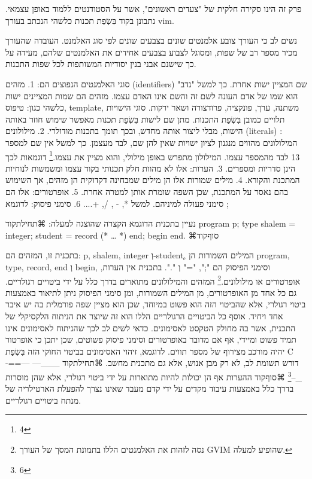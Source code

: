       פרק זה הינו סקירה חלקית של "צעדים ראשונים", אשר על הסטודנטים ללמוד באופן עצמאי.
      נתבונן בקוד בִּשְׂפַת  תכנות כלשהי הנכתב בעורך vim. 
      
      
      נשים לב כי העורך צובע אלמנטים שונים בצבעים שונים לפי סוג האלמנט. העובדה שהעורך מכיר מספר רב של שפות, ומסוגל לצבוע בצבעים אחידים את האלמנטים שלהם, מעידה על כך שישנם  אבני בנין יסודיות המשותפות לכל שפות התכנות.


      סוגי האלמנטים הנפוצים הם:
      1. מזהים (identifiers) שם המציין ישות אחרת. כך למשל "נדב" הוא שמו של אדם העונה לשם זה והשם אינו האדם עצמו. מזהים הם שמות המציינים ישות כלשהי כגון: טיפוס, template, משתנה, ערך, פונקציה, פרודצורה ושאר ירקות. סוגי הישויות תלויים כמובן בִּשְׂפַת  התכנות.
      מתן שם לישות בִּשְׂפַת  תכנות מאפשר שימוש חוזר באותה הישות, מבלי ליצור אותה מחדש, ובכך תומך בתכנות מודולרי.
      2. מילולונים (literals) : המילולונים מהווים מנגנון לציון ישויות שאין להן שם, לבד מעצמן. כך למשל אין שם למספר 13 לבד מהמספר עצמו. המילולון מתפרש באופן מילולי, והוא מציין את עצמו.\footnote{4}  דוגמאות לכך הינן סדריות ומספרים.
      3. הערות: אלו לא מהוות חלק תכנותי בקוד עצמו ומשמשות לנוחיות המתכנת והקורא.
      4. מילים שמורות אלו הן מילים שמבחינה דקדוקית הן מזהים, אך השימוש בהם נאסר על המתכנת, שכן השפה שומרת אותן למטרה אחרת.
      5. אופרטורים: אלו הם סימני פעולה למיניהם. למשל *, - , /, +....
      6. סימני פיסוק: לדוגמא ;

      נעיין בתכנית הדוגמא הקצרה שהוצגה למעלה:
⌘תחילת{קוד}
program p;
type
shalem = integer;
student = record  (* … *) end;
begin
end.
⌘סוף{קוד}


      בתכנית זו, המזהים הם: p, shalem, integer וְ-studentְ, המילים השמורות הן program, type, record, end וְ begin, וסימני הפיסוק הם ";", "=" וְ ".". בתכנית אין הערות, אופרטורים או מילולונים.\footnote{ נסה לזהות את האלמנטים הללו בתמונת המסך של העורך GVIM שהופיע למעלה.}
      המזהים והמילולונים מתוארים בדרך כלל על ידי ביטויים רגולריים. גם כל אחד מן האופרטורים, מן המילים השמורות, ומן סימני הפיסוק ניתן לתיאור באמצעות ביטוי רגולרי, אלא שהביטוי הזה הוא פשוט במיוחד, שכן הוא מציין שפה פורמלית בה יש איבר אחד ויחיד. אוסף כל הביטויים הרגולריים הללו הוא זה שיוצר את הניתוח הלקסיקלי של התכנית, אשר בה מחולק הטקסט לאסימונים.
      כדאי לשים לב לכך שהניתוח לאסימונים אינו תמיד פשוט ומיידי, אף אם מדובר באופרטורים וסימני פיסוק פשוטים, שכן יתכן כי אופרטור יהיה מורכב מצירוף של מספר תווים. לדוגמא, זיהוי האסימונים בביטוי החוקי הזה בִּשְׂפַת C דורש תשומת לב, לא רק מבן אנוש, אלא גם מתכנית מחשב.
⌘תחילת{קוד}
\_\_\_--- ---==-\_--\footnote{6}
⌘סוף{קוד}
      ההערות אף הן יכולות להיות מתוארות על ידי ביטוי רגולרי, אלא שהן מוסרות בדרך כלל
      באמצעות עיבוד מקדים על ידי קדם מעבד שאינו נצרך להפעלת הארטילריה של מנתח ביטויים
      רגולריים.

